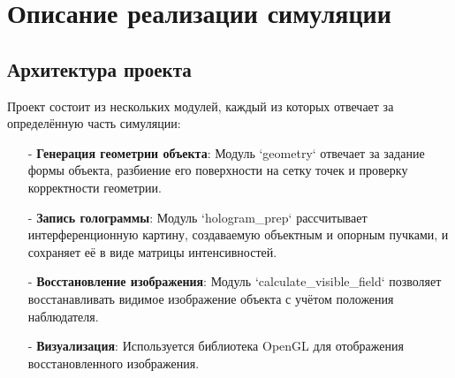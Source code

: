 \documentclass[aps,twocolumn,secnumarabic,balancelastpage,amsmath,amssymb,nofootinbib, floatfix]{revtex4-1}
\begin{document}
\section{Описание реализации симуляции } 

\subsection{Архитектура проекта }

Проект состоит из нескольких модулей, каждый из которых отвечает за определённую часть симуляции:  
\begin{enumerate}
\item[-]\textbf{Генерация геометрии объекта}:  
Модуль `geometry` отвечает за задание формы объекта, разбиение его поверхности на сетку точек и проверку корректности геометрии.  

\item[-]\textbf{Запись голограммы}:  
Модуль `hologram\_prep` рассчитывает интерференционную картину, создаваемую объектным и опорным пучками, и сохраняет её в виде матрицы интенсивностей.  

\item[-]\textbf{Восстановление изображения}:  
Модуль `calculate\_visible\_field` позволяет восстанавливать видимое изображение объекта с учётом положения наблюдателя.  

\item[-]\textbf{Визуализация}:  
Используется библиотека OpenGL для отображения восстановленного изображения.  
\end{enumerate}
\end{document}
